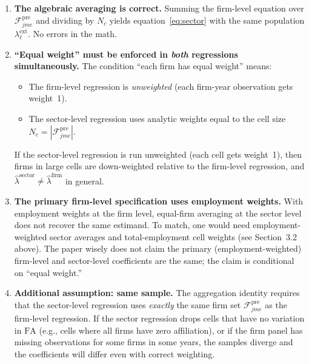 \documentclass{article}
\newcommand{\FA}{\mathrm{FA}}
\newcommand{\cFpre}{\mathcal{F}^{\mathrm{pre}}}
\theoremstyle{plain}
\begin{document}
\begin{enumerate}
  \item \textbf{The algebraic averaging is correct.}  Summing the
    firm-level equation over $\cFpre_{jme}$ and dividing by $N_c$ yields
    equation~\eqref{eq:sector} with the same population $\lambda^\mathrm{ext}_\ell$.
    No errors in the math.

  \item \textbf{``Equal weight'' must be enforced in \emph{both}
    regressions simultaneously.}  The condition ``each firm has equal weight''
    means:
    \begin{itemize}
      \item The firm-level regression is \emph{unweighted} (each firm-year
        observation gets weight~1).
      \item The sector-level regression uses analytic weights equal to the
        cell size $N_c = |\cFpre_{jme}|$.
    \end{itemize}
    If the sector-level regression is run unweighted (each cell gets weight~1),
    then firms in large cells are down-weighted relative to the firm-level
    regression, and $\hat\lambda^\mathrm{sector} \neq
    \hat\lambda^\mathrm{firm}$ in general.

  \item \textbf{The primary firm-level specification uses employment weights.}
    With employment weights at the firm level, equal-firm averaging at the
    sector level does not recover the same estimand.  To match, one would need
    employment-weighted sector averages and total-employment cell weights (see
    Section~3.2 above).  The paper wisely does not claim the primary
    (employment-weighted) firm-level and sector-level coefficients are the same;
    the claim is conditional on ``equal weight.''

  \item \textbf{Additional assumption: same sample.}  The aggregation identity
    requires that the sector-level regression uses \emph{exactly} the same firm
    set $\cFpre_{jme}$ as the firm-level regression.  If the sector regression
    drops cells that have no variation in $\FA$ (e.g., cells where all firms
    have zero affiliation), or if the firm panel has missing observations for
    some firms in some years, the samples diverge and the coefficients will
    differ even with correct weighting.


\end{enumerate}
\end{document}
